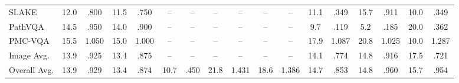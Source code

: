 \begin{table}[t]
{\begin{tabular}{l cc cc cc cc cc | cc cc cc}
SLAKE
& 12.0 & .800 & 11.5 & .750 & -- & -- & -- & --
& -- & -- & 11.1 & .349 & 15.7 & .911 & 10.0 & .349 \\

PathVQA
& 14.5 & .950 & 14.0 & .900 & -- & -- & -- & --
& -- & -- & 9.7 & .119 & 5.2 & .185 & 20.0 & .362 \\

PMC-VQA
& 15.5 & 1.050 & 15.0 & 1.000 & -- & -- & -- & --
& -- & -- & 17.9 & 1.087 & 20.8 & 1.025 & 10.0 & 1.287 \\

\midrule
Image Avg.
& 13.9 & .925
& 13.4 & .875
& -- & --
& -- & --
& -- & --
& 14.1 & .774
& 14.8 & .916
& 17.5 & .721 \\
\midrule

Overall Avg.
& 13.9 & .929
& 13.4 & .874
& 10.7 & .450
& 21.8 & 1.431
& 18.6 & 1.386
& 14.7 & .853
& 14.8 & .960
& 15.7 & .954 \\

\bottomrule
\end{tabular}
}
\end{table}
